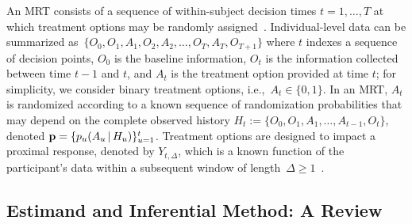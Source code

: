 \documentclass[lineno]{biometrika}
\def\given{\, | \,}
\begin{document}
An MRT consists of a sequence of within-subject decision times $t=1,\ldots,T$ at which treatment options may be randomly assigned~\citep{Liaoetal2015}.  Individual-level data can be summarized as~$\{ O_0, O_1, A_1, O_2, A_2, \ldots, O_T, A_T, O_{T+1} \}$
where $t$ indexes a sequence of decision points, $O_0$ is the baseline information, $O_t$ is the information collected between time $t-1$ and $t$, and $A_t$ is the treatment option provided at time $t$; for simplicity, we consider binary treatment options, i.e.,~$A_t \in \{ 0, 1\}$.  In an MRT, $A_t$ is randomized according to a known sequence of randomization probabilities that may depend on the complete observed history $H_t := \{ O_0, O_1, A_1, \ldots, A_{t-1}, O_t \}$,  denoted ${\bf p} = \{ p_u (A_u \given H_u) \}_{u=1}^t$. Treatment options are designed to impact a proximal response, denoted by $Y_{t,\Delta}$, which is a known function of the participant’s data within a subsequent window of length~$\Delta \ge 1$~\citep{DempseyAOAS}.

\subsection{Estimand and Inferential Method: A Review}
\label{section:standardmrtmethods}
\end{document}

